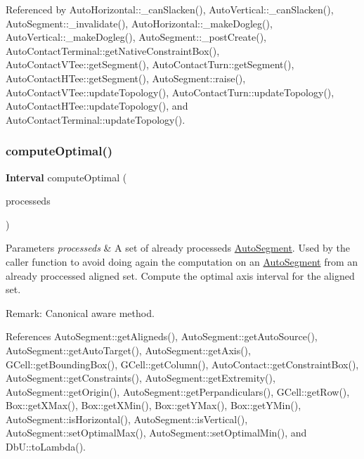 Referenced by Auto\+Horizontal\+::\+\_\+can\+Slacken(), Auto\+Vertical\+::\+\_\+can\+Slacken(), Auto\+Segment\+::\+\_\+invalidate(), Auto\+Horizontal\+::\+\_\+make\+Dogleg(), Auto\+Vertical\+::\+\_\+make\+Dogleg(), Auto\+Segment\+::\+\_\+post\+Create(), Auto\+Contact\+Terminal\+::get\+Native\+Constraint\+Box(), Auto\+Contact\+V\+Tee\+::get\+Segment(), Auto\+Contact\+Turn\+::get\+Segment(), Auto\+Contact\+H\+Tee\+::get\+Segment(), Auto\+Segment\+::raise(), Auto\+Contact\+V\+Tee\+::update\+Topology(), Auto\+Contact\+Turn\+::update\+Topology(), Auto\+Contact\+H\+Tee\+::update\+Topology(), and Auto\+Contact\+Terminal\+::update\+Topology().

\mbox{\label{classKatabatic_1_1AutoSegment_aa902247a1e967e52cc3ab087cd52b366}} 
\subsubsection{\texorpdfstring{compute\+Optimal()}{computeOptimal()}}
{\footnotesize\ttfamily \textbf{ Interval} compute\+Optimal (\begin{DoxyParamCaption}\item[{set$<$ \hyperlink{classKatabatic_1_1AutoSegment}{Auto\+Segment} $\ast$$>$ \&}]{processeds }\end{DoxyParamCaption})}


\begin{DoxyParams}{Parameters}
{\em processeds} & A set of already processeds \hyperlink{classKatabatic_1_1AutoSegment}{Auto\+Segment}. Used by the caller function to avoid doing again the computation on an \hyperlink{classKatabatic_1_1AutoSegment}{Auto\+Segment} from an already proccessed aligned set. Compute the optimal axis interval for the aligned set.\\
\hline
\end{DoxyParams}
\begin{DoxyParagraph}{Remark\+:}
Canonical aware method. 
\end{DoxyParagraph}


References Auto\+Segment\+::get\+Aligneds(), Auto\+Segment\+::get\+Auto\+Source(), Auto\+Segment\+::get\+Auto\+Target(), Auto\+Segment\+::get\+Axis(), G\+Cell\+::get\+Bounding\+Box(), G\+Cell\+::get\+Column(), Auto\+Contact\+::get\+Constraint\+Box(), Auto\+Segment\+::get\+Constraints(), Auto\+Segment\+::get\+Extremity(), Auto\+Segment\+::get\+Origin(), Auto\+Segment\+::get\+Perpandiculars(), G\+Cell\+::get\+Row(), Box\+::get\+X\+Max(), Box\+::get\+X\+Min(), Box\+::get\+Y\+Max(), Box\+::get\+Y\+Min(), Auto\+Segment\+::is\+Horizontal(), Auto\+Segment\+::is\+Vertical(), Auto\+Segment\+::set\+Optimal\+Max(), Auto\+Segment\+::set\+Optimal\+Min(), and Db\+U\+::to\+Lambda().

